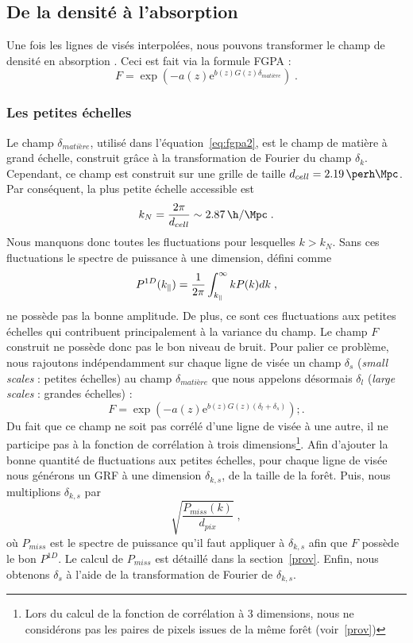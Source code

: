 \documentclass[11pt, twoside, a4paper, openright]{report}
\begin{document}
\subsection{De la densité à l'absorption}
Une fois les lignes de visés interpolées, nous pouvons transformer le champ de densité en absorption \lya{}. Ceci est fait via la formule FGPA :
\begin{equation}
  \label{eq:fgpa2}
F = \exp( - a(z) \mathrm{e}^{b(z) G(z) \delta_{matière}}) \;.  
\end{equation}

\subsubsection{Les petites échelles}
Le champ $\delta_{matière}$, utilisé dans l'équation~\ref{eq:fgpa2}, est le champ de matière à grand échelle, construit grâce à la transformation de Fourier du champ $\delta_k$.
Cependant, ce champ est construit sur une grille de taille $d_{cell} = \SI{2.19}{\perh\Mpc}$. Par conséquent, la plus petite échelle accessible est
\begin{equation}
  k_N = \frac{2 \pi}{d_{cell}} \sim \SI{2.87}{\h\per\Mpc} \; .
\end{equation}
  Nous manquons donc toutes les fluctuations pour lesquelles $k > k_N$. Sans ces fluctuations le spectre de puissance à une dimension, défini comme
\begin{equation}
  \label{eq:p1d}
  P^{1D}(k_{\parallel}{}) = \frac{1}{2 \pi} \int_{k_{\parallel}{}}^{\infty} k P(k) dk \; ,
\end{equation}
ne possède pas la bonne amplitude. De plus, ce sont ces fluctuations aux petites échelles qui contribuent principalement à la variance du champ. Le champ $F$ construit ne possède donc pas le bon niveau de bruit.
Pour palier ce problème, nous rajoutons indépendamment sur chaque ligne de visée un champ $\delta_s$ (\emph{small scales} : petites échelles) au champ $\delta_{matière}$ que nous appelons désormais $\delta_{l}$ (\emph{large scales} : grandes échelles) :
\begin{equation}
  \label{eq:fgpa3}
  F = \exp( - a(z) \mathrm{e}^{b(z) G(z) (\delta_l + \delta_s)}) ;.
\end{equation}
Du fait que ce champ ne soit pas corrélé d'une ligne de visée à une autre, il ne participe pas à la fonction de corrélation à trois dimensions\footnote{Lors du calcul de la fonction de corrélation à 3 dimensions, nous ne considérons pas les paires de pixels issues de la même forêt (voir~\ref{prov})}. Afin d'ajouter la bonne quantité de fluctuations aux petites échelles, pour chaque ligne de visée nous générons un GRF à une dimension $\delta_{k,s}$, de la taille de la forêt. Puis, nous multiplions $\delta_{k,s}$ par
\begin{equation}
  \sqrt{\frac{P_{miss}(k)}{d_{pix}}} \; ,
\end{equation}
où $P_{miss}$ est le spectre de puissance qu'il faut appliquer à $\delta_{k,s}$ afin que $F$ possède le bon $P^{1D}$. Le calcul de $P_{miss}$ est détaillé dans la section~\ref{prov}. Enfin, nous obtenons $\delta_s$ à l'aide de la transformation de Fourier de $\delta_{k,s}$.
\end{document}
